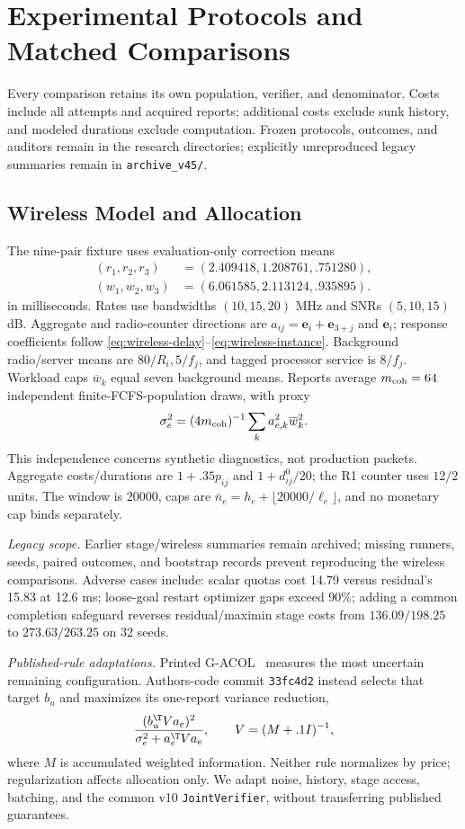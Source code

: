 \section{Experimental Protocols and Matched Comparisons}
\label{app:experiments}
Every comparison retains its own population, verifier, and denominator. Costs include all attempts and acquired reports; additional costs exclude sunk history, and modeled durations exclude computation. Frozen protocols, outcomes, and auditors remain in the research directories; explicitly unreproduced legacy summaries remain in \texttt{archive\_v45/}.

\subsection{Wireless Model and Allocation}
\label{app:wireless-parameters}
The nine-pair fixture uses evaluation-only correction means
$$
\begin{aligned}
(r_1,r_2,r_3)&=(2.409418,1.208761,.751280),\\
(w_1,w_2,w_3)&=(6.061585,2.113124,.935895).
\end{aligned}
$$
in milliseconds. Rates use bandwidths $(10,15,20)$ MHz and SNRs $(5,10,15)$ dB. Aggregate and radio-counter directions are $a_{ij}=\mathbf e_i+\mathbf e_{3+j}$ and $\mathbf e_i$; response coefficients follow \eqref{eq:wireless-delay}--\eqref{eq:wireless-instance}. Background radio/server means are $80/R_i,5/f_j$, and tagged processor service is $8/f_j$. Workload caps $\overline w_k$ equal seven background means. Reports average $m_{\rm coh}=64$ independent finite-FCFS-population draws, with proxy
$$\sigma_e^2=(4m_{\rm coh})^{-1}\sum_k a_{e,k}^2\overline w_k^2.$$
This independence concerns synthetic diagnostics, not production packets. Aggregate costs/durations are $1+.35p_{ij}$ and $1+d_{ij}^0/20$; the R1 counter uses $12/2$ units. The window is 20000, caps are $\bar n_e=h_e+\lfloor20000/\ell_e\rfloor$, and no monetary cap binds separately.

\label{app:restored-comparisons}
\emph{Legacy scope.} Earlier stage/wireless summaries remain archived; missing runners, seeds, paired outcomes, and bootstrap records prevent reproducing the wireless comparisons. Adverse cases include: scalar quotas cost 14.79 versus residual's 15.83 at 12.6 ms; loose-goal restart optimizer gaps exceed 90\%; adding a common completion safeguard reverses residual/maximin stage costs from $136.09/198.25$ to $273.63/263.25$ on 32 seeds. 

\label{app:allocation-replication}
\emph{Published-rule adaptations.} Printed G-ACOL~\cite{lindner2022} measures the most uncertain remaining configuration. Authors-code commit \texttt{33fc4d2} instead selects that target $b_u$ and maximizes its one-report variance reduction,
$$\frac{(b_u^{\T}Va_e)^2}{\sigma_e^2+a_e^{\T}Va_e},\qquad V=(M+.1I)^{-1},$$
where $M$ is accumulated weighted information. Neither rule normalizes by price; regularization affects allocation only. We adapt noise, history, stage access, batching, and the common v10 \texttt{JointVerifier}, without transferring published guarantees.


